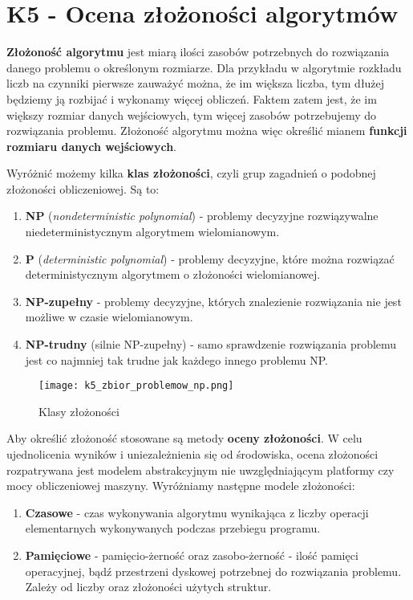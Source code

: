 \section{K5 - Ocena złożoności algorytmów}

\textbf{Złożoność algorytmu} jest miarą ilości zasobów potrzebnych do rozwiązania danego problemu o określonym rozmiarze. Dla przykładu w algorytmie rozkładu liczb na czynniki pierwsze zauważyć można, że im większa liczba, tym dłużej będziemy ją rozbijać i wykonamy więcej obliczeń. Faktem zatem jest, że im większy rozmiar danych wejściowych, tym więcej zasobów potrzebujemy do rozwiązania problemu. Złożoność algorytmu można więc określić mianem \textbf{funkcji rozmiaru danych wejściowych}.

Wyróżnić możemy kilka \textbf{klas złożoności}, czyli grup zagadnień o podobnej złożoności obliczeniowej. Są to:
\begin{enumerate}
	\item \textbf{NP} (\textit{nondeterministic polynomial}) - problemy decyzyjne rozwiązywalne niedeterministycznym algorytmem wielomianowym.
	\item \textbf{P} (\textit{deterministic polynomial}) - problemy decyzyjne, które można rozwiązać deterministycznym algorytmem o złożoności wielomianowej.
	\item \textbf{NP-zupełny} - problemy decyzyjne, których znalezienie rozwiązania nie jest możliwe w czasie wielomianowym.
	\item \textbf{NP-trudny} (silnie NP-zupełny) - samo sprawdzenie rozwiązania problemu jest co najmniej tak trudne jak każdego innego problemu NP.
\end{enumerate}

\begin{figure}[!h]
\centering
\texttt{[image: k5\_zbior\_problemow\_np.png]}
\caption{Klasy złożoności}
\end{figure}

Aby określić złożoność stosowane są metody \textbf{oceny złożoności}. W celu ujednolicenia wyników i uniezależnienia się od środowiska, ocena złożoności rozpatrywana jest modelem abstrakcyjnym nie uwzględniającym platformy czy mocy obliczeniowej maszyny. Wyróżniamy następne modele złożoności:
\begin{enumerate}
	\item \textbf{Czasowe} - czas wykonywania algorytmu wynikająca z liczby operacji elementarnych wykonywanych podczas przebiegu programu.
	\item \textbf{Pamięciowe} - pamięcio-żerność oraz zasobo-żerność - ilość pamięci operacyjnej, bądź przestrzeni dyskowej potrzebnej do rozwiązania problemu. Zależy od liczby oraz złożoności użytych struktur.
\end{enumerate}

